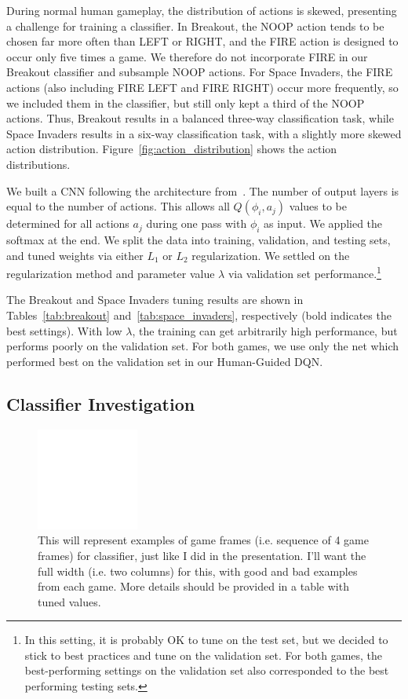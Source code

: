 \documentclass[letterpaper, 10pt, conference]{ieeeconf}
\begin{document}
During normal human gameplay, the distribution of actions is skewed, presenting
a challenge for training a classifier. In Breakout, the NOOP action tends to be
chosen far more often than LEFT or RIGHT, and the FIRE action is designed to
occur only five times a game. We therefore do not incorporate FIRE in our
Breakout classifier and subsample NOOP actions. For Space Invaders, the FIRE
actions (also including FIRE LEFT and FIRE RIGHT) occur more frequently, so we
included them in the classifier, but still only kept a third of the NOOP
actions.  Thus, Breakout results in a balanced three-way classification task,
while Space Invaders results in a six-way classification task, with a slightly
more skewed action distribution.  Figure~\ref{fig:action_distribution} shows the
action distributions.

We built a CNN following the architecture from~\cite{mnih-dqn-2015}. The number
of output layers is equal to the number of actions.  This allows all
$Q(\phi_i,a_j)$ values to be determined for all actions $a_j$ during one pass
with $\phi_i$ as input. We applied the softmax at the end. We split the data
into training, validation, and testing sets, and tuned weights via either $L_1$
or $L_2$ regularization. We settled on the regularization method and parameter
value $\lambda$ via validation set performance.\footnote{In this setting, it is
probably OK to tune on the test set, but we decided to stick to best practices
and tune on the validation set.  For both games, the best-performing settings on
the validation set also corresponded to the best performing testing sets.}

The Breakout and Space Invaders tuning results are shown in
Tables~\ref{tab:breakout} and~\ref{tab:space_invaders}, respectively (bold
indicates the best settings). With low $\lambda$, the training can get
arbitrarily high performance, but performs poorly on the validation set. For
both games, we use only the net which performed best on the validation set in
our Human-Guided DQN.




\subsection{Classifier Investigation}

\begin{figure}[t]
\centering
\includegraphics[width=0.30\textwidth]{figures/empty.png}
\caption{\footnotesize
This will represent examples of game frames (i.e. sequence of 4 game frames) for
classifier, just like I did in the presentation. I'll want the full width (i.e.
two columns) for this, with good and bad examples from each game. More details
should be provided in a table with tuned values.
}
\label{fig:example_game_frames}
\end{figure}
\end{document}
